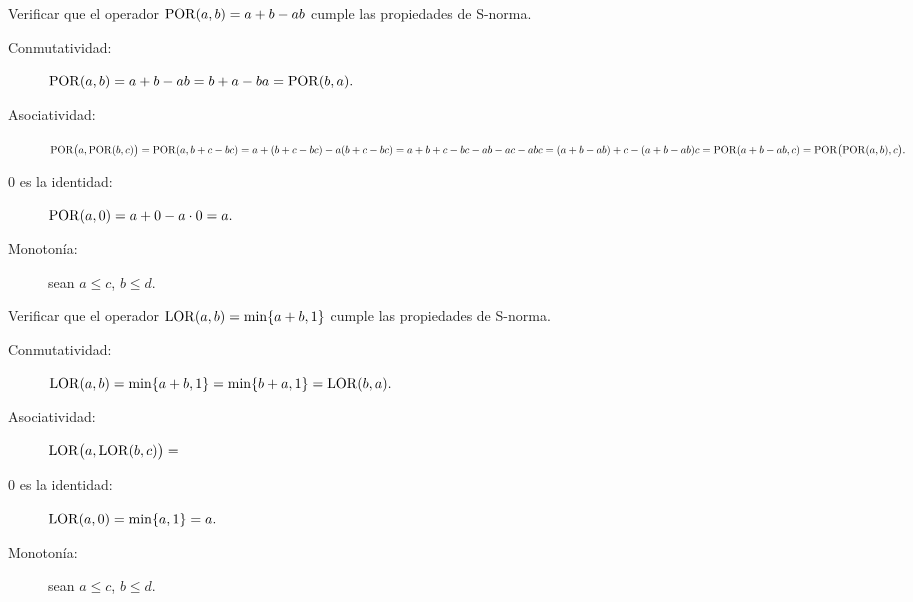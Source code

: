 Verificar que el operador \(\operatorname{POR}(a, b) = a + b - ab\)
cumple las propiedades de S-norma.
%
\begin{description}
  \item[Conmutatividad:]
    \(
      \operatorname{POR}(a, b) =
      a + b - ab =
      b + a - ba =
      \operatorname{POR}(b, a).
    \)
  \item[Asociatividad:]
    \(
      \operatorname{POR}\bigl(a, \operatorname{POR}(b, c)\bigr) =
      \operatorname{POR}(a, b + c - bc) =
      a + (b + c - bc) - a(b + c - bc) =
      a + b + c - bc - ab - ac - abc =
      (a + b - ab) + c - (a + b - ab)c =
      \operatorname{POR}(a + b - ab, c) =
      \operatorname{POR}\bigl(\operatorname{POR}(a, b), c\bigr).
    \)
  \item[0 es la identidad:]
    \(
      \operatorname{POR}(a, 0) = a + 0 - a\cdot 0 = a.
    \)
  \item[Monotonía:] sean \(a ≤ c\), \(b ≤ d\).
\end{description}

Verificar que el operador \(\operatorname{LOR}(a, b) = \min\{a + b, 1\}\)
cumple las propiedades de S-norma.
%
\begin{description}
  \item[Conmutatividad:]
    \(
      \operatorname{LOR}(a, b) =
      \min\{a + b, 1\} =
      \min\{b + a, 1\} =
      \operatorname{LOR}(b, a).
    \)
  \item[Asociatividad:]
    \(
      \operatorname{LOR}\bigl(a, \operatorname{LOR}(b, c)\bigr) =
    \)
  \item[0 es la identidad:]
    \(
      \operatorname{LOR}(a, 0) =
      \min\{a, 1\} =
      a.
    \)
  \item[Monotonía:] sean \(a ≤ c\), \(b ≤ d\).
\end{description}

